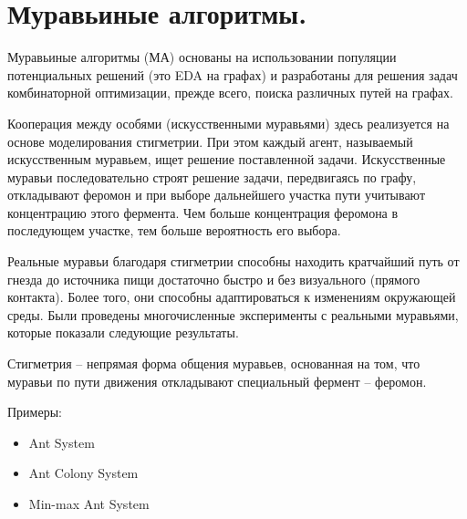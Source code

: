 \section{Муравьиные алгоритмы.}

Муравьиные алгоритмы (МА) основаны на использовании популяции потенциальных решений (это EDA на графах) и разработаны для решения задач комбинаторной оптимизации, прежде всего, поиска различных путей на графах. 

Кооперация между особями (искусственными муравьями) здесь реализуется на основе моделирования стигметрии. При этом каждый агент, называемый искусственным муравьем, ищет решение поставленной задачи. Искусственные муравьи последовательно строят решение задачи, передвигаясь по графу, откладывают феромон и при выборе дальнейшего участка пути учитывают концентрацию этого фермента. Чем больше концентрация феромона в последующем участке, тем больше вероятность его выбора.

Реальные муравьи благодаря стигметрии способны находить кратчайший путь от гнезда до источника пищи достаточно быстро и без визуального (прямого контакта). Более того, они способны адаптироваться к изменениям окружающей среды. Были проведены многочисленные эксперименты с реальными муравьями, которые показали следующие результаты.

Стигметрия – непрямая форма общения муравьев, основанная на том, что муравьи по пути движения откладывают специальный фермент – феромон.

Примеры:
\begin{itemize}
      \item Ant System
      \item Ant Colony System
      \item Min-max Ant System
   \end{itemize}

